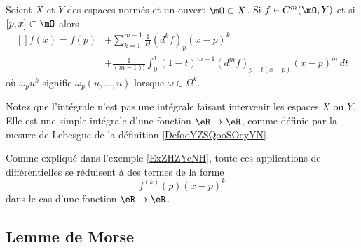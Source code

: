 \begin{proposition}\label{PropAXaSClx}
    Soient \( X\) et \( Y\) des espaces normés et un ouvert \( \mO\subset X\). Si \( f\in C^m(\mO,Y)\) et si \( [p,x]\subset \mO\) alors
    \begin{equation}
        \begin{aligned}[]
            f(x)=f(p)&+\sum_{k=1}^{m-1}\frac{1}{ k! }(d^kf)_p (x-p)^k \\
            &+\frac{1}{ (m-1)! }\int_0^1(1-t)^{m-1}(d^mf)_{ p+t(x-p) }(x-p)^m\,dt 
        \end{aligned}
    \end{equation}
    où \( \omega_pu^k\) signifie \( \omega_p(u,\ldots, u)\) lorsque \( \omega\in \Omega^k\).
\end{proposition}

Notez que l'intégrale n'est pas une intégrale faisant intervenir les espaces \( X\) ou \( Y\). Elle est une simple intégrale d'une fonction \( \eR\to \eR\), comme définie par la mesure de Lebesgue de la définition \ref{DefooYZSQooSOcyYN}.

Comme expliqué dans l'exemple \ref{ExZHZYcNH}, toute ces applications de différentielles se réduisent à des termes de la forme
\begin{equation}
    f^{(k)}(p)(x-p)^k
\end{equation}
dans le cas d'une fonction \( \eR\to\eR\).

\subsection{Lemme de Morse}

